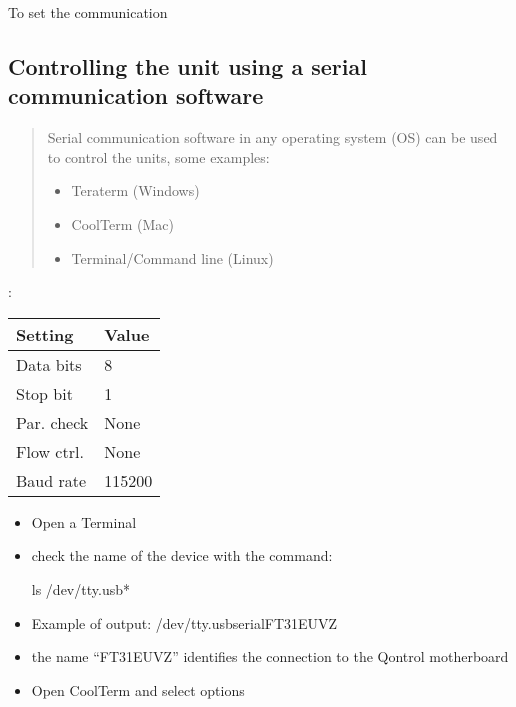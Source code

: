 \documentclass[letterpaper,10pt,english]{sphinxmanual}
\begin{document}
To set the communication


\subsection{Controlling the unit using a serial communication software}
\label{\detokenize{guide/getting_started:controlling-the-unit-using-a-serial-communication-software}}\begin{quote}

Serial communication software in any operating system (OS) can be used to control the units, some examples:
\begin{itemize}
\item {} 
Teraterm (Windows)

\item {} 
CoolTerm (Mac)

\item {} 
Terminal/Command line (Linux)

\end{itemize}
\end{quote}


 :


\begin{savenotes}\sphinxattablestart
\centering
\begin{tabulary}{\linewidth}[t]{|T|T|}
\hline
\sphinxstyletheadfamily 
Setting
&\sphinxstyletheadfamily 
Value
\\
\hline
Data bits
&
8
\\
\hline
Stop bit
&
1
\\
\hline
Par. check
&
None
\\
\hline
Flow ctrl.
&
None
\\
\hline
Baud rate
&
115200
\\
\hline
\end{tabulary}
\par
\sphinxattableend\end{savenotes}


\begin{itemize}
\item {} 
Open a Terminal

\item {} 
check the name of the device with the command:

ls /dev/tty.usb*

\item {} 
Example of output:
/dev/tty.usbserial\sphinxhyphen{}FT31EUVZ

\item {} 
the name “FT31EUVZ” identifies the connection to the Qontrol motherboard

\item {} 
Open CoolTerm and select options

\end{itemize}
\end{document}

